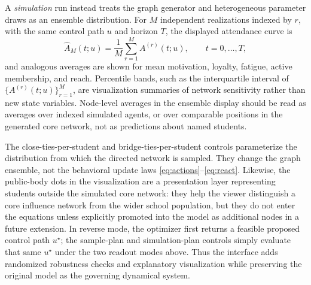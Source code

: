 \documentclass[11pt]{article}
\begin{document}
A \emph{simulation} run instead treats the graph generator and heterogeneous parameter draws as an ensemble distribution. For $M$ independent realizations indexed by $r$, with the same control path $u$ and horizon $T$, the displayed attendance curve is
\begin{equation}
 \widehat A_M(t;u)=\frac{1}{M}\sum_{r=1}^{M} A^{(r)}(t;u),
 \qquad t=0,\dots,T,
 \label{eq:ensembleA}
\end{equation}
and analogous averages are shown for mean motivation, loyalty, fatigue, active membership, and reach. Percentile bands, such as the interquartile interval of $\{A^{(r)}(t;u)\}_{r=1}^M$, are visualization summaries of network sensitivity rather than new state variables. Node-level averages in the ensemble display should be read as averages over indexed simulated agents, or over comparable positions in the generated core network, not as predictions about named students.

The close-ties-per-student and bridge-ties-per-student controls parameterize the distribution from which the directed network is sampled. They change the graph ensemble, not the behavioral update laws \eqref{eq:actions}--\eqref{eq:react}. Likewise, the public-body dots in the visualization are a presentation layer representing students outside the simulated core network: they help the viewer distinguish a core influence network from the wider school population, but they do not enter the equations unless explicitly promoted into the model as additional nodes in a future extension. In reverse mode, the optimizer first returns a feasible proposed control path $u^\star$; the sample-plan and simulation-plan controls simply evaluate that same $u^\star$ under the two readout modes above. Thus the interface adds randomized robustness checks and explanatory visualization while preserving the original model as the governing dynamical system.

\end{document}
